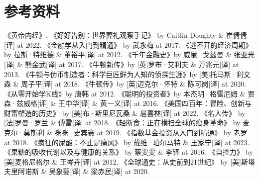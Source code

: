 \documentclass[12pt,oneside]{book}
\begin{document}
\chapter{参考资料}
\begin{thebibliography}{99}
 《黄帝内经》.
 《好好告别：世界葬礼观察手记》 by Caitlin Doughty \& 崔倩倩[译] at 2022. 
 《金融学从入门到精通》 by 武永梅 at 2017.
 《逃不开的经济周期》 by 拉斯·特维德 \& 董裕平[译] at 2012.
 《千年金融史》by 威廉·戈兹曼  \& 张亚光[译] \& 熊金武[译] at 2017.
 《牛顿新传》by [英]罗布·艾利夫 \& 万兆元[译] at 2013.
 《牛顿与伪币制造者：科学巨匠鲜为人知的侦探生涯》by [美]托马斯·利文森 \& 周子平[译] at 2018. 
 《牛顿传》by [英]迈克尔·怀特 \& 陈可岗[译] at 2020.
 《从零开始学K线》by 唐韩 at 2012. 
 《聪明的投资者》by 本杰明·格雷厄姆 \& 贾森·兹威格[评] \& 王中华[译] \& 黄一义[译] at 2016.
 《美国四百年：冒险、创新与财富塑造的历史》 by [美]布·斯里尼瓦桑 \& 扈喜林[译] at 2022.
 《名人传》 by [法]罗曼·罗兰 \& 傅雷[译] at 2018.
  《轻断食：正在横扫全球的瘦身革命》 by 麦克尔·莫斯利 \& 咪咪·史宾赛 at 2019.
  《指数基金投资从入门到精通》 by 老罗 at 2018.
  《疯狂的尿酸：不止是痛风》 by 戴维·珀尔马特 \& 王家宁[译] at 2023.
  《果糖的吸收代谢以及与健康的关系》 by 蔡雯雯 \& 李铎 at 2016.
  《自控力》 by [美]麦格尼格尔  \& 王岑卉[译] at 2012.
  《全球通史：从史前到21世纪》 by [美]斯塔夫里阿诺斯  \& 吴象婴[译] \& 梁赤民[译] at 2020.
\end{thebibliography}
\end{document}
